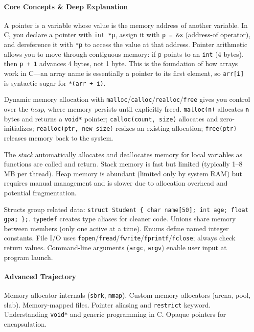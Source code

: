 \documentclass[11pt, a4paper, oneside]{report}
\begin{document}
\paragraph{Core Concepts \& Deep Explanation} A pointer is a variable whose value is the memory address of another variable. In C, you declare a pointer with \texttt{int *p}, assign it with \texttt{p = \&x} (address-of operator), and dereference it with \texttt{*p} to access the value at that address. Pointer arithmetic allows you to move through contiguous memory: if \texttt{p} points to an \texttt{int} (4 bytes), then \texttt{p + 1} advances 4 bytes, not 1 byte. This is the foundation of how arrays work in C---an array name is essentially a pointer to its first element, so \texttt{arr[i]} is syntactic sugar for \texttt{*(arr + i)}.

Dynamic memory allocation with \texttt{malloc}/\texttt{calloc}/\texttt{realloc}/\texttt{free} gives you control over the \emph{heap}, where memory persists until explicitly freed. \texttt{malloc(n)} allocates \texttt{n} bytes and returns a \texttt{void*} pointer; \texttt{calloc(count, size)} allocates and zero-initializes; \texttt{realloc(ptr, new\_size)} resizes an existing allocation; \texttt{free(ptr)} releases memory back to the system.

The \emph{stack} automatically allocates and deallocates memory for local variables as functions are called and return. Stack memory is fast but limited (typically 1--8\,MB per thread). Heap memory is abundant (limited only by system RAM) but requires manual management and is slower due to allocation overhead and potential fragmentation.

Structs group related data: \texttt{struct Student \{ char name[50]; int age; float gpa; \};}. \texttt{typedef} creates type aliases for cleaner code. Unions share memory between members (only one active at a time). Enums define named integer constants. File I/O uses \texttt{fopen}/\texttt{fread}/\texttt{fwrite}/\texttt{fprintf}/\texttt{fclose}; always check return values. Command-line arguments (\texttt{argc}, \texttt{argv}) enable user input at program launch.

\paragraph{Advanced Trajectory} Memory allocator internals (\texttt{sbrk}, \texttt{mmap}). Custom memory allocators (arena, pool, slab). Memory-mapped files. Pointer aliasing and \texttt{restrict} keyword. Understanding \texttt{void*} and generic programming in C. Opaque pointers for encapsulation.
\end{document}
